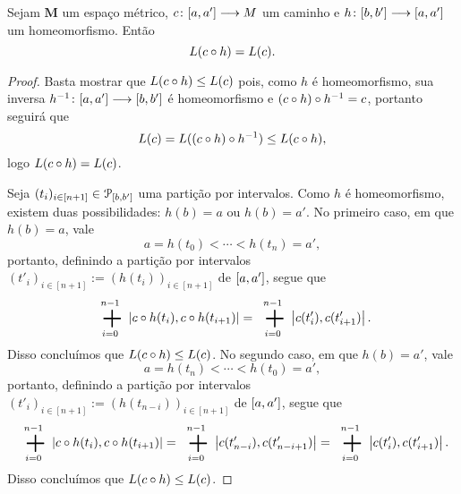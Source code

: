 \begin{proposition}
Sejam $\bm M$ um espaço métrico, ${c}\colon {\left[{a},{a'}\right]} \longrightarrow {M}$ um caminho e ${h}\colon {\left[{b},{b'}\right]} \longrightarrow {\left[{a},{a'}\right]}$ um homeomorfismo. Então
	\begin{equation*}
	L(c \circ h) = L(c).
	\end{equation*}
\end{proposition}
\begin{proof}
Basta mostrar que $L(c \circ h) \leq L(c)$ pois, como $h$ é homeomorfismo, sua inversa ${h^{-1}}\colon {\left[{a},{a'}\right]} \longrightarrow {\left[{b},{b'}\right]}$ é homeomorfismo e $(c \circ h) \circ h^{-1} = c$, portanto seguirá que
	\begin{equation*}
	L(c) = L((c \circ h) \circ h^{-1}) \leq L(c \circ h),
	\end{equation*}
logo $L(c \circ h) = L(c)$.

Seja $(t_i)_{i \in [n+1]} \in \mathcal{P}_{\left[{b},{b'}\right]}$ uma partição por intervalos. Como $h$ é homeomorfismo, existem duas possibilidades: $h(b)=a$ ou $h(b)=a'$. No primeiro caso, em que $h(b)=a$, vale
	\begin{equation*}
	a = h(t_0) < \cdots < h(t_n) = a',
	\end{equation*}
portanto, definindo a partição por intervalos $(t'_i)_{i \in [n+1]} := (h(t_i))_{i \in [n+1]}$ de $\left[{a},{a'}\right]$, segue que
	\begin{equation*}
	\sum_{i=0}^{n-1} \dist{c\circ h(t_i)}{c \circ h(t_{i+1})} = \sum_{i=0}^{n-1} \dist{c(t'_i)}{c(t'_{i+1})}.
	\end{equation*}
Disso concluímos que $L(c \circ h) \leq L(c)$. No segundo caso, em que $h(b)=a'$, vale
	\begin{equation*}
	a = h(t_n) < \cdots < h(t_0) = a',
	\end{equation*}
portanto, definindo a partição por intervalos $(t'_i)_{i \in [n+1]} := (h(t_{n-i}))_{i \in [n+1]}$ de $\left[{a},{a'}\right]$, segue que
	\begin{equation*}
	\sum_{i=0}^{n-1} \dist{c\circ h(t_i)}{c \circ h(t_{i+1})} = \sum_{i=0}^{n-1} \dist{c(t'_{n-i})}{c(t'_{n-i+1})} = \sum_{i=0}^{n-1} \dist{c(t'_{i})}{c(t'_{i+1})}.
	\end{equation*}
Disso concluímos que $L(c \circ h) \leq L(c)$.
\end{proof}


